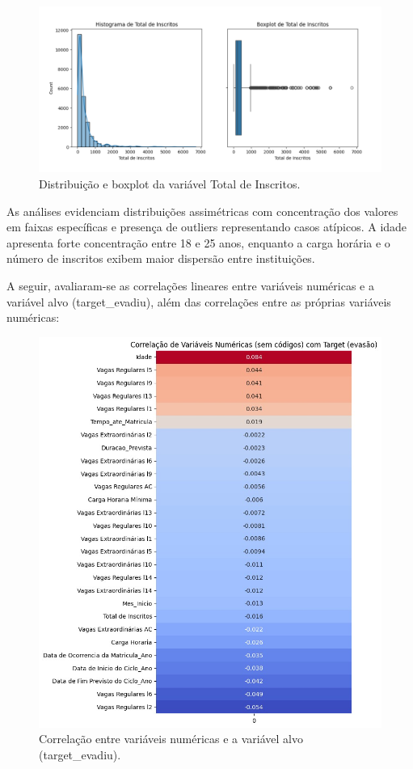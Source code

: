 \documentclass[english, spanish, brazilian]{RBIEarticle} %
\begin{document}
\begin{figure}[H]\centering
	\includegraphics[width=1\textwidth]{images/descritivo-inscritos.png}
	\caption{Distribuição e boxplot da variável Total de Inscritos.}
	\label{fig:total-inscritos}
\end{figure}

As análises evidenciam distribuições assimétricas com concentração dos valores em faixas específicas e presença de outliers representando casos atípicos. A idade apresenta forte concentração entre 18 e 25 anos, enquanto a carga horária e o número de inscritos exibem maior dispersão entre instituições.

A seguir, avaliaram-se as correlações lineares entre variáveis numéricas e a variável alvo (\mbox{target\_evadiu}), além das correlações entre as próprias variáveis numéricas:

\begin{figure}[H]\centering
	\includegraphics[width=1\textwidth]{images/correlacao_variaveis_num_com_target.jpeg}
	\caption{Correlação entre variáveis numéricas e a variável alvo \mbox{(target\_evadiu)}.}
	\label{fig:corr-num-target}
\end{figure}
\end{document}
